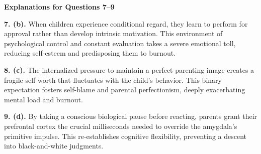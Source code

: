 \begin{practiceexercise}
\textbf{Explanations for Questions 7--9}

\textbf{7. (b).} When children experience conditional regard, they learn to perform for approval rather than develop intrinsic motivation. This environment of psychological control and constant evaluation takes a severe emotional toll, reducing self-esteem and predisposing them to burnout.

\textbf{8. (c).} The internalized pressure to maintain a perfect parenting image creates a fragile self-worth that fluctuates with the child's behavior. This binary expectation fosters self-blame and parental perfectionism, deeply exacerbating mental load and burnout.

\textbf{9. (d).} By taking a conscious biological pause before reacting, parents grant their prefrontal cortex the crucial milliseconds needed to override the amygdala's primitive impulse. This re-establishes cognitive flexibility, preventing a descent into black-and-white judgments.
\vspace{\fill}
\end{practiceexercise}

\newpage
